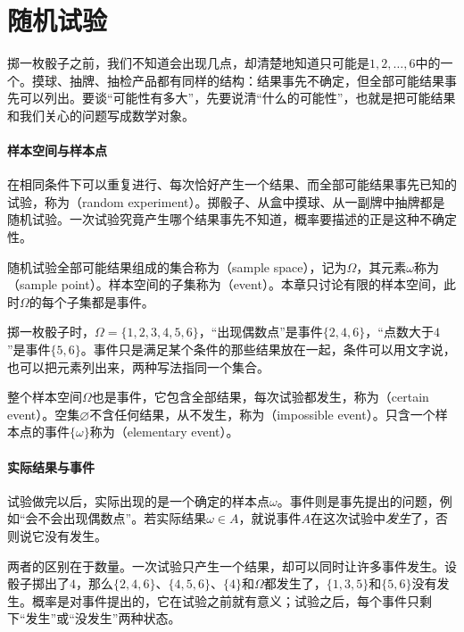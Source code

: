 \section{随机试验}
\label{sec:cprob-experiments}

掷一枚骰子之前，我们不知道会出现几点，却清楚地知道只可能是$1,2,\ldots,6$中的一个。摸球、抽牌、抽检产品都有同样的结构：结果事先不确定，但全部可能结果事先可以列出。要谈“可能性有多大”，先要说清“什么的可能性”，也就是把可能结果和我们关心的问题写成数学对象。

\paragraph{样本空间与样本点}
在相同条件下可以重复进行、每次恰好产生一个结果、而全部可能结果事先已知的试验，称为（random experiment）。掷骰子、从盒中摸球、从一副牌中抽牌都是随机试验。一次试验究竟产生哪个结果事先不知道，概率要描述的正是这种不确定性。

\begin{definition}[样本空间与事件]
\label{def:cprob-sample-space}
随机试验全部可能结果组成的集合称为（sample space），记为$\Omega$，其元素$\omega$称为（sample point）。样本空间的子集称为（event）。本章只讨论有限的样本空间，此时$\Omega$的每个子集都是事件。
\end{definition}

掷一枚骰子时，$\Omega=\{1,2,3,4,5,6\}$，“出现偶数点”是事件$\{2,4,6\}$，“点数大于$4$”是事件$\{5,6\}$。事件只是满足某个条件的那些结果放在一起，条件可以用文字说，也可以把元素列出来，两种写法指同一个集合。

整个样本空间$\Omega$也是事件，它包含全部结果，每次试验都发生，称为（certain event）。空集$\varnothing$不含任何结果，从不发生，称为（impossible event）。只含一个样本点的事件$\{\omega\}$称为（elementary event）。

\paragraph{实际结果与事件}
试验做完以后，实际出现的是一个确定的样本点$\omega$。事件则是事先提出的问题，例如“会不会出现偶数点”。若实际结果$\omega\in A$，就说事件$A$在这次试验中\emph{发生}了，否则说它没有发生。

两者的区别在于数量。一次试验只产生一个结果，却可以同时让许多事件发生。设骰子掷出了$4$，那么$\{2,4,6\}$、$\{4,5,6\}$、$\{4\}$和$\Omega$都发生了，$\{1,3,5\}$和$\{5,6\}$没有发生。概率是对事件提出的，它在试验之前就有意义；试验之后，每个事件只剩下“发生”或“没发生”两种状态。

